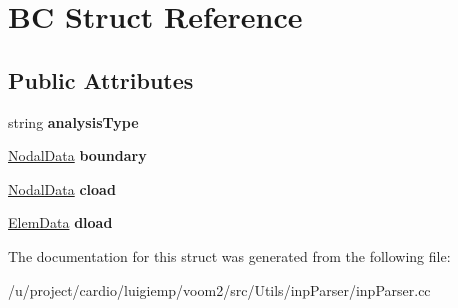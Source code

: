 \hypertarget{struct_b_c}{
\section{BC Struct Reference}
\label{struct_b_c}
}
\subsection*{Public Attributes}
\begin{DoxyCompactItemize}
\item 
\hypertarget{struct_b_c_acbbbb6459947520c51717c07077304a4}{
string {\bfseries analysisType}}
\label{struct_b_c_acbbbb6459947520c51717c07077304a4}

\item 
\hypertarget{struct_b_c_ad64bd2bf5093eff338b11e458d302f50}{
\hyperlink{struct_nodal_data}{NodalData} {\bfseries boundary}}
\label{struct_b_c_ad64bd2bf5093eff338b11e458d302f50}

\item 
\hypertarget{struct_b_c_a8cc98acf91a7d47b4903c5531e52439e}{
\hyperlink{struct_nodal_data}{NodalData} {\bfseries cload}}
\label{struct_b_c_a8cc98acf91a7d47b4903c5531e52439e}

\item 
\hypertarget{struct_b_c_aa24ff506821f8d4fe49ab1d148a88ace}{
\hyperlink{struct_elem_data}{ElemData} {\bfseries dload}}
\label{struct_b_c_aa24ff506821f8d4fe49ab1d148a88ace}

\end{DoxyCompactItemize}


The documentation for this struct was generated from the following file:\begin{DoxyCompactItemize}
\item 
/u/project/cardio/luigiemp/voom2/src/Utils/inpParser/inpParser.cc\end{DoxyCompactItemize}
